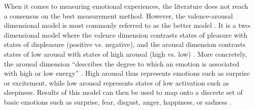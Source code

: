 When it comes to measuring emotional experiences, the literature does not reach a consensus on the best measurement method. However, the valence-arousal dimensional model is most commonly referred to as the better model \autocite{russell1980circumplex, mauss2009measures}. It is a two-dimensional model where the valence dimension contrasts states of pleasure with states of displeasure (positive vs. negative), and the arousal dimension contrasts states of low arousal with states of high arousal (high vs. low) \autocite{mauss2009measures}. More concretely, the arousal dimension \enquote{describes the degree to which an emotion is associated with high or low energy} \autocite[p.~1334]{tseng2014using}. High arousal thus represents emotions such as surprise or excitement, while low arousal represents states of low activation such as sleepiness. Results of this model can then be used to map onto a discrete set of basic emotions such as surprise, fear, disgust, anger, happiness, or sadness \autocite{brave2007emotion}.

